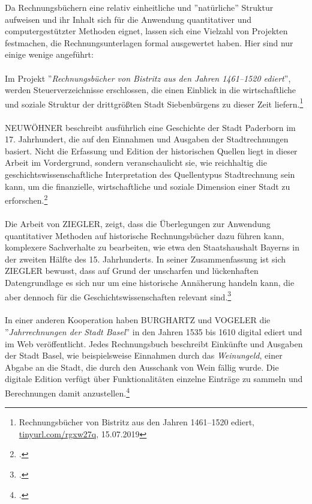\documentclass[12pt,a4paper]{article}
\begin{document}
Da Rechnungsbüchern eine relativ einheitliche und ''natürliche'' Struktur aufweisen und ihr Inhalt sich für die Anwendung quantitativer und computergestützter Methoden eignet, lassen sich eine Vielzahl von Projekten festmachen, die Rechnungsunterlagen formal ausgewertet haben. Hier sind nur einige wenige angeführt:
\\
\\
Im Projekt ''\textit{Rechnungsbücher von Bistritz aus den Jahren 1461–1520 ediert}'', werden Steuerverzeichnisse erschlossen, die einen Einblick in die wirtschaftliche und soziale Struktur der drittgrößten Stadt Siebenbürgens zu dieser Zeit liefern.\footnote{Rechnungsbücher von Bistritz aus den Jahren 1461–1520 ediert, \url{tinyurl.com/rgxw27q}, 15.07.2019}
\\
\\
NEUWÖHNER beschreibt ausführlich eine Geschichte der Stadt Paderborn im 17. Jahrhundert, die auf den Einnahmen und Ausgaben der Stadtrechnungen basiert. Nicht die Erfassung und Edition der historischen Quellen liegt in dieser Arbeit im Vordergrund, sondern veranschaulicht sie, wie reichhaltig die geschichtswissenschaftliche Interpretation des Quellentypus Stadtrechnung sein kann, um die finanzielle, wirtschaftliche und soziale Dimension einer Stadt zu erforschen.\footcite[][S.11-50]{neuwohner2016rechnen}  
\\
\\
Die Arbeit von ZIEGLER, zeigt, dass die Überlegungen zur Anwendung quantitativer Methoden auf historische Rechnungsbücher dazu führen kann, komplexere Sachverhalte zu bearbeiten, wie etwa den Staatshaushalt Bayerns in der zweiten Hälfte des 15. Jahrhunderts. In seiner Zusammenfassung ist sich ZIEGLER bewusst, dass auf Grund der unscharfen und lückenhaften Datengrundlage es sich nur um eine historische Annäherung handeln kann, die aber dennoch für die Geschichtswissenschaften relevant sind.\footcite[][S.221-230]{ziegler1981Staatshaushalt}
\\
\\
In einer anderen Kooperation haben BURGHARTZ und VOGELER die ''\textit{Jahrrechnungen der Stadt Basel}'' in den Jahren 1535 bis 1610 digital ediert und im Web veröffentlicht. Jedes Rechnungsbuch beschreibt Einkünfte und Ausgaben der Stadt Basel, wie beispielsweise Einnahmen durch das \textit{Weinungeld}, einer Abgabe an die Stadt, die durch den Ausschank von Wein fällig wurde. Die digitale Edition verfügt über Funktionalitäten einzelne Einträge zu sammeln und  Berechnungen damit anzustellen.\footcite[][S.11-13, \protect\url{gams.uni-graz.at/srbas}]{vogeler2016content}
\end{document}
